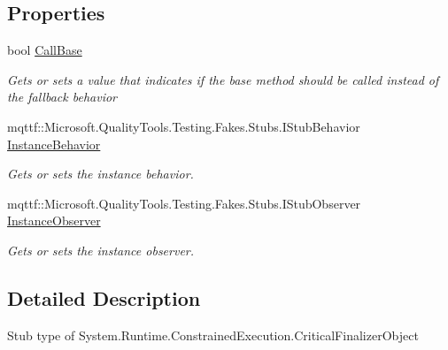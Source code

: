 \subsection*{Properties}
\begin{DoxyCompactItemize}
\item 
bool \hyperlink{class_system_1_1_runtime_1_1_constrained_execution_1_1_fakes_1_1_stub_critical_finalizer_object_aa9a063f4c90fe404054566c7c51cc83a}{Call\-Base}
\begin{DoxyCompactList}\small\item\em Gets or sets a value that indicates if the base method should be called instead of the fallback behavior\end{DoxyCompactList}\item 
mqttf\-::\-Microsoft.\-Quality\-Tools.\-Testing.\-Fakes.\-Stubs.\-I\-Stub\-Behavior \hyperlink{class_system_1_1_runtime_1_1_constrained_execution_1_1_fakes_1_1_stub_critical_finalizer_object_a37a4643126d7ff1cf1eb12ee9b5abdf9}{Instance\-Behavior}
\begin{DoxyCompactList}\small\item\em Gets or sets the instance behavior.\end{DoxyCompactList}\item 
mqttf\-::\-Microsoft.\-Quality\-Tools.\-Testing.\-Fakes.\-Stubs.\-I\-Stub\-Observer \hyperlink{class_system_1_1_runtime_1_1_constrained_execution_1_1_fakes_1_1_stub_critical_finalizer_object_a9daebf04dc7566840ab6467505dfa5ad}{Instance\-Observer}
\begin{DoxyCompactList}\small\item\em Gets or sets the instance observer.\end{DoxyCompactList}\end{DoxyCompactItemize}


\subsection{Detailed Description}
Stub type of System.\-Runtime.\-Constrained\-Execution.\-Critical\-Finalizer\-Object



